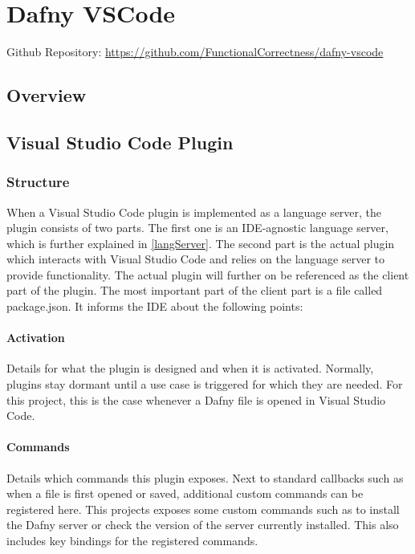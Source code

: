 \section{Dafny VSCode}
Github Repository: \href{https://github.com/FunctionalCorrectness/dafny-vscode}{https://github.com/FunctionalCorrectness/dafny-vscode}

\subsection{Overview}

\subsection{Visual Studio Code Plugin}
\subsubsection{Structure}
When a Visual Studio Code plugin is implemented as a language server, the plugin consists of two parts. The first one is an IDE-agnostic language server, which is further explained in \ref{langServer}. The second part is the actual plugin which interacts with Visual Studio Code and relies on the language server to provide functionality. \newline
The actual plugin will further on be referenced as the client part of the plugin. The most important part of the client part is a file called package.json. It informs the IDE about the following points:
\paragraph{Activation}
Details for what the plugin is designed and when it is activated. Normally, plugins stay dormant until a use case is triggered for which they are needed. For this project, this is the case whenever a Dafny file is opened in Visual Studio Code.

\paragraph{Commands}
Details which commands this plugin exposes. Next to standard callbacks such as when a file is first opened or saved, additional custom commands can be registered here. This projects exposes some custom commands such as to install the Dafny server or check the version of the server currently installed. This also includes key bindings for the registered commands.

